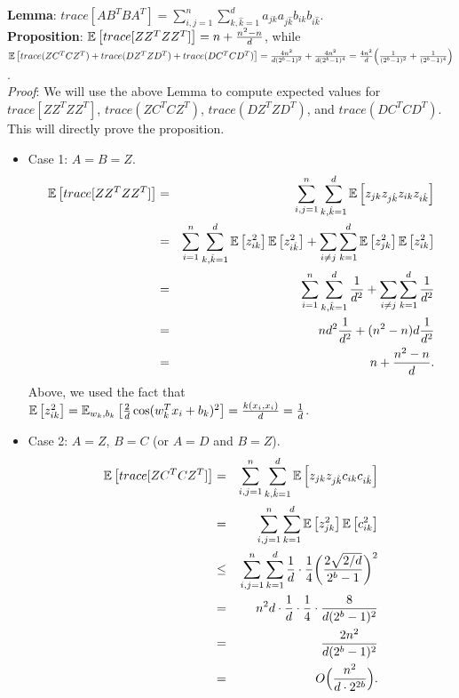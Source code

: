 \documentclass[12pt]{article}
\newcommand{\hk}{\hat{k}}
\begin{document}
\noindent\textbf{Lemma}: $trace[AB^TBA^T] = \sum_{i,j=1}^n \sum_{k,\hk=1}^d a_{jk}a_{j\hk}b_{ik}b_{i\hk}$.\\

\noindent \textbf{Proposition}:  $\expect{}{trace[ZZ^TZZ^T]} = n + \frac{n^2-n}{d}$, while 
$\expect{}{trace(ZC^TCZ^T) + trace(DZ^TZD^T) + trace(DC^TCD^T)} = \frac{4n^2}{d(2^b-1)^2} + \frac{4n^2}{d(2^b-1)^4} = \frac{4n^2}{d}\Big(\frac{1}{(2^b-1)^2} + \frac{1}{(2^b-1)^4}\Big)$. \\

\noindent \textit{Proof}:  We will use the above Lemma to compute expected values for $trace[ZZ^TZZ^T]$, $trace(ZC^TCZ^T)$, $trace(DZ^TZD^T)$, and $trace(DC^TCD^T)$.  This will directly prove the proposition.

\begin{itemize}
	\item Case 1: $A=B=Z$.
	\begin{eqnarray*}
		\expect{}{trace[ZZ^TZZ^T]} &=& \sum_{i,j=1}^n \sum_{k,\hk=1}^d \expect{}{z_{jk}z_{j\hk}z_{ik}z_{i\hk}}\\
		&=& \sum_{i=1}^n \sum_{k,\hk=1}^d \expect{}{z_{ik}^2}\expect{}{z_{i\hk}^2} + \sum_{i\neq j} \sum_{k=1}^d \expect{}{z_{jk}^2}\expect{}{z_{ik}^2}\\
		&=& \sum_{i=1}^n \sum_{k,\hk=1}^d \frac{1}{d^2} + \sum_{i\neq j} \sum_{k=1}^d \frac{1}{d^2}\\
		&=& nd^2\frac{1}{d^2} + (n^2-n)d\frac{1}{d^2}\\
		&=& n + \frac{n^2-n}{d}.
	\end{eqnarray*}
	Above, we used the fact that $\expect{}{z_{ik}^2} = \expect{w_k,b_k}{\frac{2}{d}\cos(w_k^T x_i + b_k)^2} = \frac{k(x_i,x_i)}{d} = \frac{1}{d}$.
	\item Case 2: $A=Z$, $B=C$ (or $A=D$ and $B=Z$).
	\begin{eqnarray*}
		\expect{}{trace[ZC^TCZ^T]} &=& \sum_{i,j=1}^n \sum_{k,\hk=1}^d \expect{}{z_{jk}z_{j\hk}c_{ik}c_{i\hk}}\\	
		&=& \sum_{i,j=1}^n \sum_{k=1}^d \expect{}{z_{jk}^2}\expect{}{c_{ik}^2}\\	
		&\leq& \sum_{i,j=1}^n \sum_{k=1}^d \frac{1}{d}\cdot \frac{1}{4}\bigg(\frac{2\sqrt{2/d}}{2^b-1}\bigg)^2\\	
		&=& n^2d \cdot \frac{1}{d}\cdot \frac{1}{4}\cdot \frac{8}{d(2^b-1)^2}\\	
		&=& \frac{2n^2}{d(2^b-1)^2} \\
		&=& O\Big(\frac{n^2}{d\cdot 2^{2b}}\Big).

\end{eqnarray*}
\end{itemize}
\end{document}

